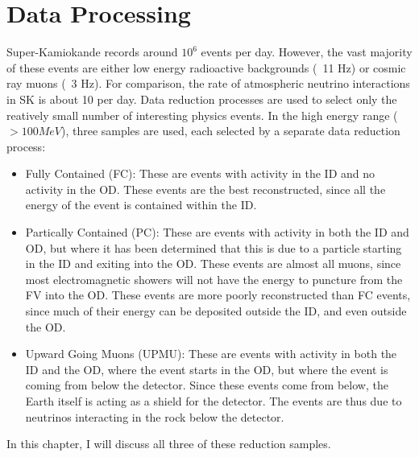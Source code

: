 \chapter{Data Processing}
\label{ch:data_processing}
\graphicspath{{data_processing/}}
Super-Kamiokande records around $10^6$ events per day.  However, the vast majority of these events are either low energy radioactive backgrounds (~11 Hz) or cosmic ray muons (~3 Hz).  For comparison, the rate of atmospheric neutrino interactions in SK is about 10 per day.  Data reduction processes are used to select only the reatively small number of interesting physics events.  In the high energy range ($>100 MeV$), three samples are used, each selected by a separate data reduction process:
\begin{itemize}
\item Fully Contained (FC):  These are events with activity in the ID and no activity in the OD.  These events are the best reconstructed, since all the energy of the event is contained within the ID.
\item Partically Contained (PC):  These are events with activity in both the ID and OD, but where it has been determined that this is due to a particle starting in the ID and exiting into the OD.  These events are almost all muons, since most electromagnetic showers will not have the energy to puncture from the FV into the OD.  These events are more poorly reconstructed than FC events, since much of their energy can be deposited outside the ID, and even outside the OD.
\item Upward Going Muons (UPMU):  These are events with activity in both the ID and the OD, where the event starts in the OD, but where the event is coming from below the detector.  Since these events come from below, the Earth itself is acting as a shield for the detector.  The events are thus due to neutrinos interacting in the rock below the detector.
\end{itemize}

In this chapter, I will discuss all three of these reduction samples.


